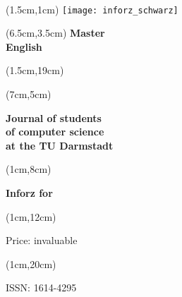 \begin{titlepage}~


    \begin{textblock*}{12cm}(1.5cm,1cm)
        \texttt{[image: inforz\_schwarz]}
    \end{textblock*}


    \begin{textblock*}{12cm}(6.5cm,3.5cm)
        \centering\fontsize{25}{25}\sffamily\textbf{
            \textcolor{mycolor}{Master } \\
            \textcolor{mycolor}{English}}
    \end{textblock*}


    \begin{textblock*}{12cm}(1.5cm,19cm)
    \end{textblock*}

    \begin{textblock*}{7cm}(7cm,5cm)
        \begin{flushright}
            \large\sffamily\textbf{
                \textcolor{.}{Journal of students}\\
                \textcolor{.}{of computer science\\at the TU Darmstadt}}
        \end{flushright}
    \end{textblock*}



    \begin{textblock*}{5cm}(1cm,8cm)
        \begin{rotate}{90}
            \sffamily\huge\textbf{
                \textcolor{.}{Inforz for \ophase}}
        \end{rotate}
    \end{textblock*}


    \begin{textblock*}{2cm}(1cm,12cm)
        \begin{rotate}{90}
            \sffamily\tiny \textcolor{.}{Price: invaluable}
        \end{rotate}
    \end{textblock*}


    \begin{textblock*}{2cm}(1cm,20cm)
        \begin{rotate}{90}
            \sffamily \textcolor{.}{ISSN: 1614-4295}
        \end{rotate}
    \end{textblock*}
\end{titlepage}
